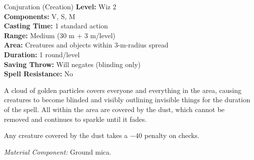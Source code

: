 {Conjuration (Creation)}
{
	\textbf{Level:}
	Wiz 2\\
	\textbf{Components:}
	V, S, M\\
	\textbf{Casting Time:}
	1 standard action\\
	\textbf{Range:}
	Medium (30 m + 3 m/level)\\
	\textbf{Area:}
	Creatures and objects within 3-m-radius spread\\
	\textbf{Duration:}
	1 round/level\\
	\textbf{Saving Throw:}
	Will negates (blinding only)\\
	\textbf{Spell Resistance:}
	No\\
}
{
	A cloud of golden particles covers everyone and everything in the area, causing creatures to become blinded and visibly outlining invisible things for the duration of the spell. All within the area are covered by the dust, which cannot be removed and continues to sparkle until it fades.

	Any creature covered by the dust takes a $-40$ penalty on  checks.

	\textit{Material Component:}
	Ground mica.

}
